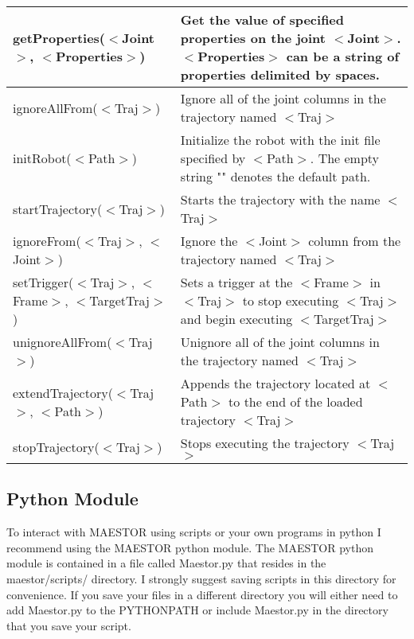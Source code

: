 \documentclass[12pt]{article}
\begin{document}
\begin{center}
\begin{tabular}{| l | p{8cm}|}
		getProperties($<$Joint$>$, $<$Properties$>$) 
		& Get the value of specified properties on the joint $<$Joint$>$. $<$Properties$>$ can be a string of properties delimited by spaces.  \\ \hline
		
		ignoreAllFrom($<$Traj$>$) 
		& Ignore all of the joint columns in the trajectory named $<$Traj$>$  \\ \hline
		
		initRobot($<$Path$>$) 
		& Initialize the robot with the init file specified by $<$Path$>$. The empty string "" denotes the default path.  \\ \hline
		
		startTrajectory($<$Traj$>$) 
		& Starts the trajectory with the name $<$Traj$>$  \\ \hline
		
		ignoreFrom($<$Traj$>$, $<$Joint$>$) 
		& Ignore the $<$Joint$>$ column from the trajectory named $<$Traj$>$  \\ \hline
		
		setTrigger($<$Traj$>$, $<$Frame$>$, $<$TargetTraj$>$)
		& Sets a trigger at the $<$Frame$>$ in $<$Traj$>$ to stop executing $<$Traj$>$ and begin executing $<$TargetTraj$>$  \\ \hline
		
		unignoreAllFrom($<$Traj$>$)
		& Unignore all of the joint columns in the trajectory named $<$Traj$>$   \\ \hline
		
		extendTrajectory($<$Traj$>$, $<$Path$>$)
		& Appends the trajectory located at $<$Path$>$ to the end of the loaded trajectory $<$Traj$>$  \\ \hline
		
		stopTrajectory($<$Traj$>$)
		& Stops executing the trajectory $<$Traj$>$  \\ \hline
	
	\end{tabular}
\end{center}
\pagebreak

\subsection{Python Module}

To interact with MAESTOR using scripts or your own programs in python I recommend using the MAESTOR python module. The MAESTOR python module is contained in a file called Maestor.py that resides in the maestor/scripts/ directory. I strongly suggest saving scripts in this directory for convenience. If you save your files in a different directory you will either need to add Maestor.py to the PYTHONPATH or include Maestor.py in the directory that you save your script. 
\end{document}
